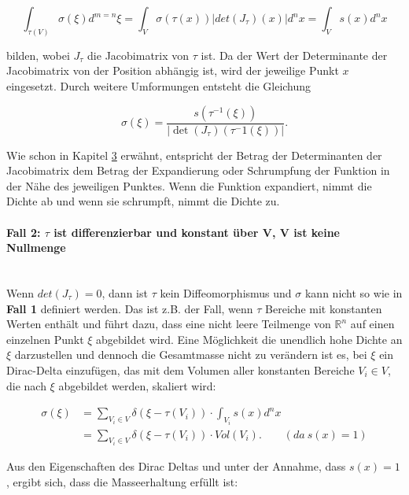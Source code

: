 \documentclass[a4paper,fontsize=12pt,toc=bib,parskip=half,ngerman]{scrartcl}
\begin{document}
\begin{equation}
\int_{\tau(V)}\sigma(\xi)d^{m=n}\xi = \int_{V}\sigma(\tau(x))|det(J_\tau)(x)|d^nx = \int_{V}s(x)d^nx
\end{equation}

bilden, wobei $J_\tau$ die Jacobimatrix von $\tau$ ist. Da der Wert der Determinante der Jacobimatrix von der Position abh\"angig ist, wird der jeweilige Punkt $x$ eingesetzt. Durch weitere Umformungen entsteht die Gleichung

\begin{equation}
\sigma(\xi) = \frac{s(\tau^{-1}(\xi))}{|\det(J_\tau)(\tau^-1(\xi))|}.
\label{Case1Formula}
\end{equation}

Wie schon in Kapitel \hyperref[sec:Grundlagen]{3} erw\"ahnt, entspricht der Betrag der Determinanten der Jacobimatrix dem Betrag der Expandierung oder Schrumpfung der Funktion in der N\"ahe des jeweiligen Punktes. Wenn die Funktion expandiert, nimmt die Dichte ab und wenn sie schrumpft, nimmt die Dichte zu.

\paragraph{Fall 2: $\tau$ ist differenzierbar und konstant \"uber V, V ist keine Nullmenge}\hspace{200pt}\\
Wenn $det(J_\tau) = 0$, dann ist $\tau$ kein Diffeomorphismus und $\sigma$ kann nicht so wie in \textbf{Fall 1} definiert werden. Das ist z.B. der Fall, wenn $\tau$ Bereiche mit konstanten Werten enth\"alt und f\"uhrt dazu, dass eine nicht leere Teilmenge von $\mathbb{R}^n$ auf einen einzelnen Punkt $\xi$ abgebildet wird. Eine M\"oglichkeit die unendlich hohe Dichte an $\xi$ darzustellen und dennoch die Gesamtmasse nicht zu ver\"andern ist es, bei $\xi$ ein Dirac-Delta einzuf\"ugen, das mit dem Volumen aller konstanten Bereiche $V_i \in V$, die nach $\xi$ abgebildet werden, skaliert wird:

\begin{equation}
\begin{split}
\sigma(\xi) &= \sum_{V_i \in V}\delta(\xi - \tau(V_i)) \cdot \int_{V_i}s(x)d^nx\\
&= \sum_{V_i \in V}\delta(\xi - \tau(V_i)) \cdot Vol(V_i).~~~~~~~~~(da~s(x) = 1)
\end{split}
\label{DiracTimesVolume}
\end{equation}

Aus den Eigenschaften des Dirac Deltas und unter der Annahme, dass $s(x) = 1$, ergibt sich, dass die Masseerhaltung erf\"ullt ist:
\end{document}
